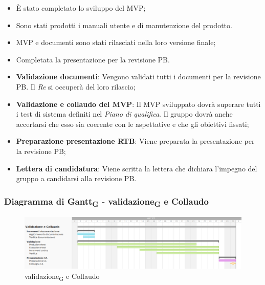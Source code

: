 \:
\begin{itemize}
	\item È stato completato lo sviluppo del MVP;
	\item Sono stati prodotti i manuali utente e di manutenzione del prodotto.
\end{itemize}

\:
\begin{itemize}
	\item MVP e documenti sono stati rilasciati nella loro versione finale;
	\item Completata la presentazione per la revisione PB.
\end{itemize}

\:
\begin{itemize}
	\item \textbf{Validazione documenti}: Vengono validati tutti i documenti per la revisione PB. Il \textit{Re} si occuperà del loro rilascio;
	\item \textbf{Validazione e collaudo del MVP}: Il MVP sviluppato dovrà superare tutti i test di sistema definiti nel \textit{Piano di qualifica}. Il gruppo dovrà anche accertarsi che esso sia coerente con le aspettative e che gli obiettivi fissati;
	\item \textbf{Preparazione presentazione RTB}: Viene preparata la presentazione per la revisione PB;
	\item \textbf{Lettera di candidatura}: Viene scritta la lettera che dichiara l'impegno del gruppo a candidarsi alla revisione PB.
\end{itemize}

\subsubsection{Diagramma di Gantt\textsubscript{G} - validazione\textsubscript{G} e Collaudo}

\begin{figure}[H]
\centering
\includegraphics[width=\textwidth]{img/4_collaudo.png}
\caption{validazione\textsubscript{G} e Collaudo}
\end{figure}

